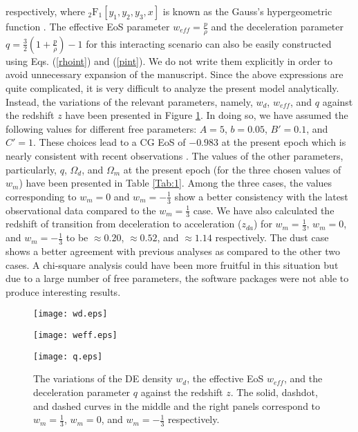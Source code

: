 \documentclass[two-column, nofootinbib]{revtex4-1}
\begin{document}
respectively, where $_2\text{F}_1[y_1,y_2,y_3,x]$ is known as the Gauss's hypergeometric function \cite{http}. The effective EoS parameter $w_{eff}=\frac{p}{\rho}$ and the deceleration parameter $q=\frac{3}{2}\left(1+\frac{p}{\rho}\right)-1$ for this interacting scenario can also be easily constructed using Eqs. (\ref{rhoint}) and (\ref{pint}). We do not write them explicitly in order to avoid unnecessary expansion of the manuscript. Since the above expressions are quite complicated, it is very difficult to analyze the present model analytically. Instead, the variations of the relevant parameters, namely, $w_d$, $w_{eff}$, and $q$ against the redshift $z$ have been presented in Figure \ref{Fig:1}. In doing so, we have assumed the following values for different free parameters: $A=5$, $b=0.05$, $B'=0.1$, and $C'=1$. These choices lead to a CG EoS of $-0.983$ at the present epoch which is nearly consistent with recent observations \cite{Ade1}. The values of the other parameters, particularly, $q$, $\Omega_d$, and $\Omega_m$ at the present epoch (for the three chosen values of $w_m$) have been presented in Table \ref{Tab:1}. Among the three cases, the values corresponding to $w_m=0$ and $w_m=-\frac{1}{3}$ show a better consistency with the latest observational data \cite{Ade1,Santos1,Campo1,Akarsu1,Nair1,Mamon1} compared to the $w_m=\frac{1}{3}$ case. We have also calculated the redshift of transition from deceleration to acceleration ($z_{da}$) for $w_m=\frac{1}{3}$, $w_m=0$, and $w_m=-\frac{1}{3}$ to be $\approx 0.20$, $\approx 0.52$, and $\approx 1.14$ respectively. The dust case shows a better agreement with previous analyses \cite{Farooq1,Farooq2} as compared to the other two cases. A chi-square analysis could have been more fruitful in this situation but due to a large number of free parameters, the software packages were not able to produce interesting results.

\begin{figure}[h]
\begin{center}
\begin{minipage}{0.315\textwidth}
\texttt{[image: wd.eps]}
\end{minipage}
\hspace*{0.15cm}
\begin{minipage}{0.315\textwidth}
\texttt{[image: weff.eps]}
\end{minipage}
\hspace*{0.15cm}
\begin{minipage}{0.315\textwidth}
\texttt{[image: q.eps]}
\end{minipage}
\caption{The variations of the DE density $w_d$, the effective EoS $w_{eff}$, and the deceleration parameter $q$ against the redshift $z$. The solid, dashdot, and dashed curves in the middle and the right panels correspond to $w_m=\frac{1}{3}$, $w_m=0$, and $w_m=-\frac{1}{3}$ respectively.}
\label{Fig:1}
\end{center}
\end{figure}
\end{document}

